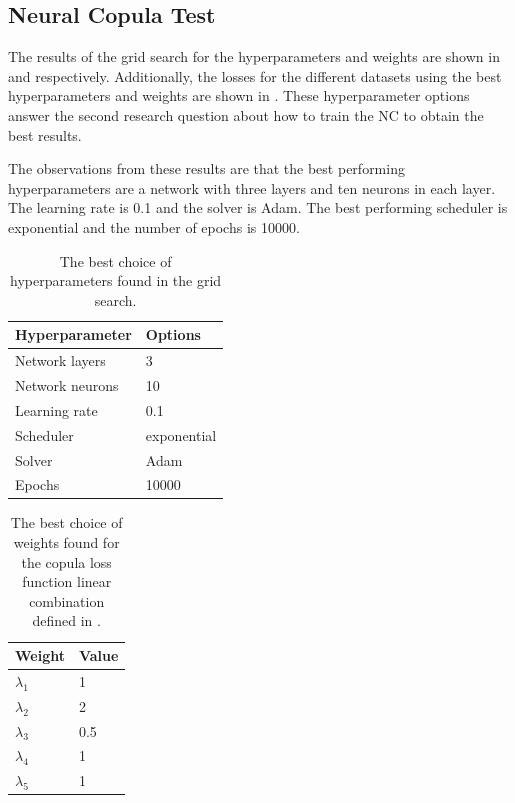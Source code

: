 \subsection{Neural Copula Test}
The results of the grid search for the hyperparameters and weights are shown in  and  respectively. Additionally, the losses for the different datasets using the best hyperparameters and weights are shown in . These hyperparameter options answer the second research question \RQtwo{} about how to train the \gls{NC} to obtain the best results. 

The observations from these results are that the best performing hyperparameters are a network with three layers and ten neurons in each layer. The learning rate is 0.1 and the solver is Adam. The best performing scheduler is exponential and the number of epochs is 10000. 

\begin{table}[h!]
    \centering
    \caption{The best choice of hyperparameters found in the grid search.}
    \begin{tabular}{ll}
    \textbf{Hyperparameter} & \textbf{Options} \\
    \hline
    Network layers & 3 \\
    Network neurons & 10 \\
    Learning rate & 0.1 \\
    Scheduler & exponential \\
    Solver & Adam \\
    Epochs & 10000 \\
    \end{tabular}
    \label{tab:Best_hyperparams}
\end{table}

\begin{table}[h!]
    \centering
    \caption{The best choice of weights found for the copula loss function linear combination defined in .}
    \begin{tabular}{ll}
    \textbf{Weight} & \textbf{Value} \\
    \hline
    $\lambda_1$ & 1 \\
    $\lambda_2$ & 2 \\
    $\lambda_3$ & 0.5 \\
    $\lambda_4$ & 1 \\
    $\lambda_5$ & 1 \\
    \end{tabular}
    \label{tab:Best_weights}
\end{table}

